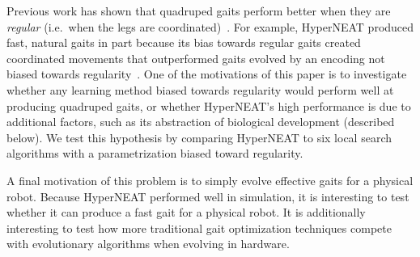 Previous work has shown that quadruped gaits perform better when they
are \emph{regular} (i.e.\ when the legs are
coordinated)~\citep{clune2009evolving,
  clune2011performance,valsalam2008modular}. For example, HyperNEAT
produced fast, natural gaits in part because its bias towards regular
gaits created coordinated movements that outperformed gaits evolved by
an encoding not biased towards regularity~\citep{clune2009evolving,
  clune2011performance}. One of the motivations of this paper is to
investigate whether any learning method biased towards regularity
would perform well at producing quadruped gaits, or whether
HyperNEAT's high performance is due to additional factors, such as its
abstraction of biological development (described below). We test this
hypothesis by comparing HyperNEAT to six local search algorithms with
a parametrization biased toward regularity.

A final motivation of this problem is to simply evolve effective gaits
for a physical robot. Because HyperNEAT performed well in simulation,
it is interesting to test whether it can produce a fast gait for a
physical robot. It is additionally interesting to test how more
traditional gait optimization techniques compete with evolutionary
algorithms when evolving in hardware.




%  
%  
% 

